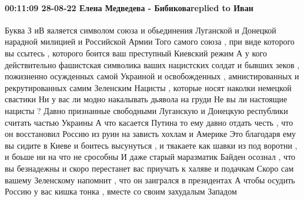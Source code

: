  
 
 
 
 

\paragraph{00:11:09 28-08-22 Елена Медведева - Бибиковаreplied to Иван}

Буква З иВ яаляется символом союза и обьединения Луганской и Донецкой нарадной
милицией и Российской Армии Того самого союза , при виде которого вы ссытесь ,
которого боится ваш преступный Киевский режим А у кого действительно фашистская
символика ваших нацистских солдат и бывших зеков , пожизненно осужденных самой
Украиной и освобожденных , амнистированных и рекрутированных самим Зеленским
Нацисты , которые носят наколки немецкой свастики Ни у вас ли модно накалывать
дьявола на груди Не вы ли настоящие нацисты ? Давно признанные свободными
Луганскую и Донецкую республики считать частью Украины А что касается Путина то
ему давно отдать честь , что он восстановил Россию из руин на зависть хохлам и
Америке Это благодаря ему вы сидите в Киеве и боитесь высунуться , и тяакаете
как шавки из под воротни , и боьше ни на что не срособны И даже старый
маразматик Байден осознал , что вы безнадежны и скоро перестанет вас приучать к
халяве и подачкам Скоро сам вашему Зеленскому напомнит , что он заигрался в
президентах А чтобы осудить Россию у вас кишка тонка , вместе со своим
захудалым Западом

